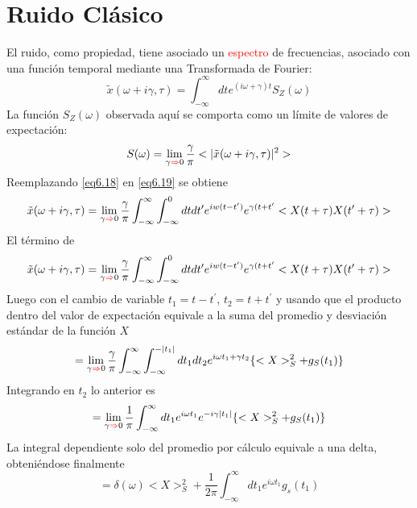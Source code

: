 \documentclass{book}
\begin{document}
\section{Ruido Clásico}
El ruido, como propiedad, tiene asociado un \textcolor{red}{espectro} de frecuencias, asociado con una función temporal mediante una Transformada de Fourier:
\begin{equation}\label{eq6.18}\tilde{x}(\omega+i\gamma, \tau)=\int_{-\infty}^{\infty} dt e^{(i\omega+\gamma)t}S_Z (\omega)\end{equation}
La función $S_Z(\omega)$ observada aquí se comporta como un límite de valores de expectación:
\begin{equation}\label{eq6.19}S(\omega)=\lim_{\gamma\textcolor{red}{\Rightarrow} 0}\frac{\gamma}{\pi}<\lvert\tilde{x}(\omega +i\gamma,\tau)\rvert^2>\end{equation} Reemplazando \ref{eq6.18} en  \ref{eq6.19} se obtiene
\begin{equation}\label{eq6.20}\tilde{x}(\omega+i\gamma, \tau)=\lim_{\gamma\textcolor{red}{\Rightarrow} 0}\frac{\gamma}{\pi}\int_{-\infty}^{\infty}\int_{-\infty}^0 dt dt^\prime e^{iw(t-t^\prime)}e^{\gamma(t+t^\prime}<X(t+\tau)X(t^\prime+\tau)>\end{equation} El término de 
\begin{equation}\label{eq6.21}\tilde{x}(\omega+i\gamma, \tau)=\lim_{\gamma\textcolor{red}{\Rightarrow} 0}\frac{\gamma}{\pi}\int_{-\infty}^{\infty}\int_{-\infty}^0 dt dt^\prime e^{iw(t-t^\prime)}e^{\gamma(t+t^\prime}<X(t+\tau)X(t^\prime+\tau)>\end{equation}
Luego con el cambio de variable $t_1=t-t^\prime$, $t_2=t+t^\prime$ y usando que el producto dentro del valor de expectación equivale a la suma del promedio y desviación estándar de la función $X$
\begin{equation}\label{eq6.22}=\lim_{\gamma\textcolor{red}{\Rightarrow} 0} \frac{\gamma}{\pi}\int_{-\infty}^\infty \int_{-\infty}^{-\lvert t_1\rvert}dt_1 dt_2 e^{i\omega t_1+\gamma t_2}\{<X>_S^2+g_S(t_1)\}\end{equation}
Integrando en $t_2$ lo anterior es
\begin{equation}\label{eq6.23}=\lim_{\gamma\textcolor{red}{\Rightarrow} 0}\frac{1}{\pi}\int_{-\infty}^\infty dt_1 e^{i\omega t_1 }e^{-i\gamma\lvert t_1\rvert}\{<X>_S^2+g_S(t_1)\}\end{equation}
La integral dependiente solo del promedio por cálculo equivale a una delta, obteniéndose finalmente
\begin{equation}\label{eq6.24}=\delta(\omega)<X>_S^2+\frac{1}{2\pi}\int_{-\infty}^{\infty} dt_1 e^{i\omega t_1}g_s(t_1)\end{equation}
\end{document}
